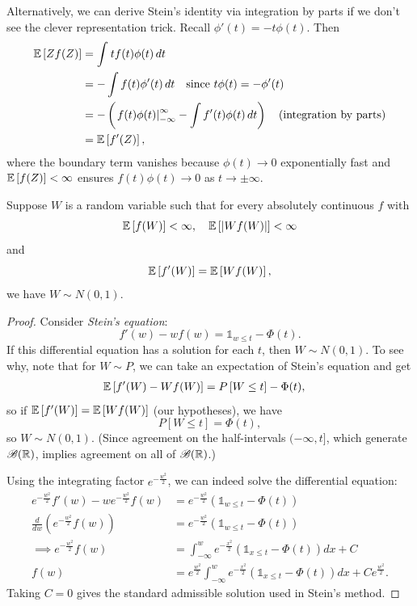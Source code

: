 \begin{aside}
	Alternatively, we can derive Stein's identity via integration by parts if we don't see the clever representation trick. Recall $\phi'(t) = -t \phi(t)$. Then
	\begin{align*}
		\mathbb{E}\left[Zf(Z)\right]
		&= \int_{}^{} t f(t)\phi(t)\,dt \\
		&= - \int f(t) \phi'(t)\,dt \quad \text{since } t\phi(t) = -\phi'(t) \\
		&= - \left( \left. f(t)\phi(t) \right|_{-\infty}^{\infty} - \int f'(t)\phi(t)\,dt \right) \quad \text{(integration by parts)}\\
		&= \mathbb{E}\left[f'(Z)\right],
	\end{align*}
	where the boundary term vanishes because $\phi(t) \to 0$ exponentially fast and $\mathbb{E}\left[f(Z)\right] < \infty$ ensures $f(t)\phi(t) \to 0$ as $t \to \pm\infty$. 
\end{aside}
\begin{proposition}
	Suppose $W$ is a random variable such that for every absolutely continuous $f$ with \[
		\mathbb{E}\left[f(W)\right] < \infty, \quad \mathbb{E}\left[\left| Wf(W)\right|\right] < \infty
	\] and \[
		\mathbb{E}\left[f'(W)\right] = \mathbb{E}\left[Wf(W)\right],
	\] we have $W \sim N\left(0,1 \right)$.
\end{proposition}
\begin{proof}
	Consider \emph{Stein's equation}: \[
		f'(w) - w f(w) = \mathds{1}_{w \le t} - \Phi(t)
	.\] If this differential equation has a solution for each $t$, then $W \sim N(0,1)$. To see why, note that for $W \sim P$, we can take an expectation of Stein's equation and get
	\begin{align*}
		\mathbb{E}\left[f'(W) - W f(W)\right] &= P\left[W \le t\right]  - \Phi(t)
	,\end{align*}
	so if $\mathbb{E}\left[f'(W)\right] = \mathbb{E}\left[Wf(W)\right] $ (our hypotheses), we have \[
		P\left[W \le t\right] = \Phi(t)
	,\] so $W \sim N(0,1)$. (Since agreement on the half-intervals $(-\infty,t]$, which generate $\mathscr{B}(\mathbb{R})$, implies agreement on all of $\mathscr{B}(\mathbb{R})$.)

	Using the integrating factor $e^{-\frac{w^2}{2}}$, we can indeed solve the differential equation:
	\begin{align*}
		e^{-\frac{w^2}{2}} f'(w) - w e^{-\frac{w^2}{2}}f(w) &= e^{-\frac{w^2}{2}}\left( \mathds{1}_{w \le t} - \Phi(t) \right) \\
		\frac{d}{dw} \left( e^{-\frac{w^2}{2}} f(w) \right) &= e^{-\frac{w^2}{2}} \left( \mathds{1}_{w \le t} - \Phi(t) \right) \\
		\implies e^{-\frac{w^2}{2}}f(w) &= \int_{-\infty}^{w} e^{-\frac{x^2}{2}}\left( \mathds{1}_{x\le t} - \Phi(t) \right)dx + C  \\
		f(w) &= e^{\frac{w^2}{2}} \int_{-\infty}^{w} e^{-\frac{x^2}{2}} \left( \mathds{1}_{x \le t} - \Phi(t) \right)dx + C e^{\frac{w^2}{2}}
	.\end{align*}
	Taking $C=0$ gives the standard admissible solution used in Stein's method.
\end{proof}


